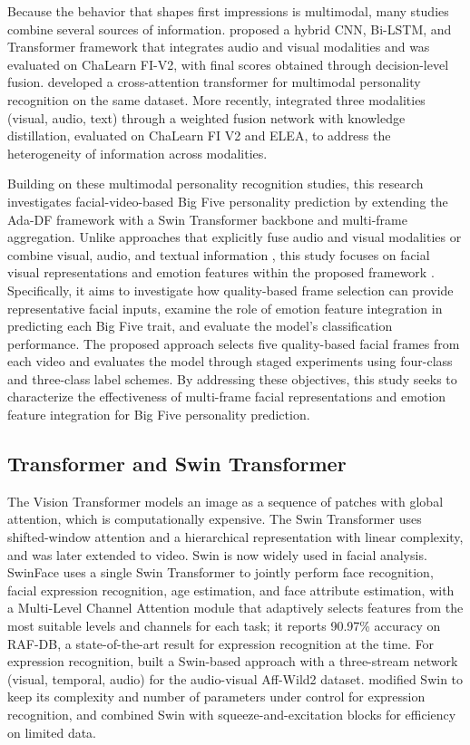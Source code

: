\documentclass[10pt,a4paper,twocolumn]{article}
\begin{document}
Because the behavior that shapes first impressions is multimodal, many studies combine several sources of information. \cite{Zhao} proposed a hybrid CNN, Bi-LSTM, and Transformer framework that integrates audio and visual modalities and was evaluated on ChaLearn FI-V2, with final scores obtained through decision-level fusion. \cite{Agrawal} developed a cross-attention transformer for multimodal personality recognition on the same dataset. More recently, \cite{Bao} integrated three modalities (visual, audio, text) through a weighted fusion network with knowledge distillation, evaluated on ChaLearn FI V2 and ELEA, to address the heterogeneity of information across modalities.

Building on these multimodal personality recognition studies, this research investigates facial-video-based Big Five personality prediction by extending the Ada-DF framework with a Swin Transformer backbone and multi-frame aggregation. Unlike approaches that explicitly fuse audio and visual modalities or combine visual, audio, and textual information \cite{Zhao,Agrawal}, this study focuses on facial visual representations and emotion features within the proposed framework \cite{wardana}. Specifically, it aims to investigate how quality-based frame selection can provide representative facial inputs, examine the role of emotion feature integration in predicting each Big Five trait, and evaluate the model's classification performance. The proposed approach selects five quality-based facial frames from each video and evaluates the model through staged experiments using four-class and three-class label schemes. By addressing these objectives, this study seeks to characterize the effectiveness of multi-frame facial representations and emotion feature integration for Big Five personality prediction.

\subsection{Transformer and Swin Transformer}

The Vision Transformer \cite{Dosovitskiy} models an image as a sequence of patches with global attention, which is computationally expensive. The Swin Transformer \cite{swin} uses shifted-window attention and a hierarchical representation with linear complexity, and was later extended to video\cite{video}. Swin is now widely used in facial analysis. SwinFace \cite{Qin} uses a single Swin Transformer to jointly perform face recognition, facial expression recognition, age estimation, and face attribute estimation, with a Multi-Level Channel Attention module that adaptively selects features from the most suitable levels and channels for each task; it reports 90.97\% accuracy on RAF-DB, a state-of-the-art result for expression recognition at the time. For expression recognition, \cite{FacialER} built a Swin-based approach with a three-stream network (visual, temporal, audio) for the audio-visual Aff-Wild2 dataset. \cite{Swin-FER} modified Swin to keep its complexity and number of parameters under control for expression recognition, and \cite{Vats2023-uq} combined Swin with squeeze-and-excitation blocks for efficiency on limited data.
\end{document}
